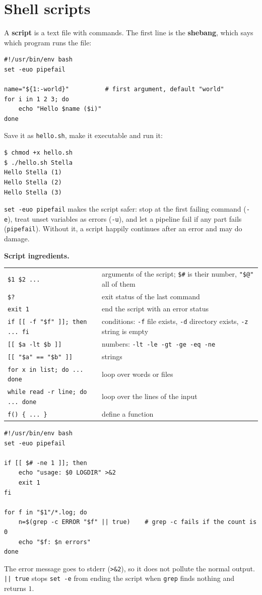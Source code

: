 \section*{Shell scripts}
A \textbf{script} is a text file with commands. The first line is the \textbf{shebang}, which says which program runs the file:
\begin{verbatim}
#!/usr/bin/env bash
set -euo pipefail

name="${1:-world}"          # first argument, default "world"
for i in 1 2 3; do
    echo "Hello $name ($i)"
done
\end{verbatim}
Save it as \texttt{hello.sh}, make it executable and run it:
\begin{verbatim}
$ chmod +x hello.sh
$ ./hello.sh Stella
Hello Stella (1)
Hello Stella (2)
Hello Stella (3)
\end{verbatim}
\texttt{set -euo pipefail} makes the script safer: stop at the first failing command (\texttt{-e}), treat unset variables as errors (\texttt{-u}), and let a pipeline fail if any part fails (\texttt{pipefail}). Without it, a script happily continues after an error and may do damage.

\textbf{Script ingredients.}
\begin{center}
\renewcommand{\arraystretch}{1.2}
\begin{tabular}{p{4.6cm}p{8.6cm}}
\verb|$1 $2 ...| & arguments of the script; \verb|$#| is their number, \verb|"$@"| all of them\\
\verb|$?| & exit status of the last command\\
\verb|exit 1| & end the script with an error status\\
\verb|if [[ -f "$f" ]]; then ... fi| & conditions: \texttt{-f} file exists, \texttt{-d} directory exists, \texttt{-z} string is empty\\
\verb|[[ $a -lt $b ]]| & numbers: \texttt{-lt -le -gt -ge -eq -ne}\\
\verb|[[ "$a" == "$b" ]]| & strings\\
\verb|for x in list; do ... done| & loop over words or files\\
\verb|while read -r line; do ... done| & loop over the lines of the input\\
\verb|f() { ... }| & define a function\\
\end{tabular}
\end{center}

\begin{example}
\begin{verbatim}
#!/usr/bin/env bash
set -euo pipefail

if [[ $# -ne 1 ]]; then
    echo "usage: $0 LOGDIR" >&2
    exit 1
fi

for f in "$1"/*.log; do
    n=$(grep -c ERROR "$f" || true)    # grep -c fails if the count is 0
    echo "$f: $n errors"
done
\end{verbatim}
The error message goes to stderr (\verb|>&2|), so it does not pollute the normal output. \verb/|| true/ stops \texttt{set -e} from ending the script when \texttt{grep} finds nothing and returns $1$.
\end{example}

